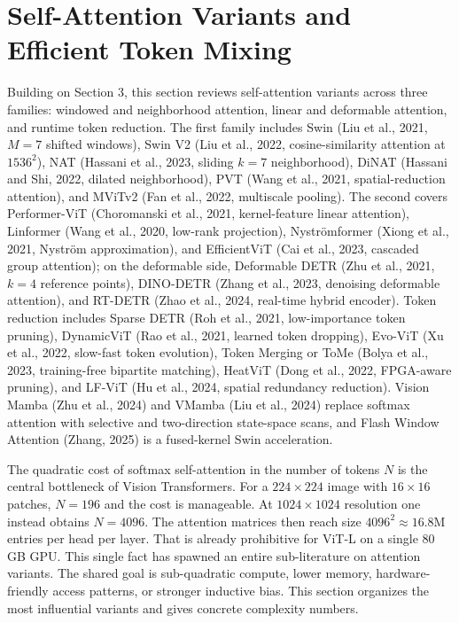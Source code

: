 \section{Self-Attention Variants and Efficient Token Mixing}\label{self-attention-variants-and-efficient-token-mixing}

Building on Section 3, this section reviews self-attention variants across three families: windowed and neighborhood attention, linear and deformable attention, and runtime token reduction. The first family includes Swin (Liu et al., 2021, \(M{=}7\) shifted windows), Swin V2 (Liu et al., 2022, cosine-similarity attention at \(1536^2\)), NAT (Hassani et al., 2023, sliding \(k{=}7\) neighborhood), DiNAT (Hassani and Shi, 2022, dilated neighborhood), PVT (Wang et al., 2021, spatial-reduction attention), and MViTv2 (Fan et al., 2022, multiscale pooling). The second covers Performer-ViT (Choromanski et al., 2021, kernel-feature linear attention), Linformer (Wang et al., 2020, low-rank projection), Nyströmformer (Xiong et al., 2021, Nyström approximation), and EfficientViT (Cai et al., 2023, cascaded group attention); on the deformable side, Deformable DETR (Zhu et al., 2021, \(k{=}4\) reference points), DINO-DETR (Zhang et al., 2023, denoising deformable attention), and RT-DETR (Zhao et al., 2024, real-time hybrid encoder). Token reduction includes Sparse DETR (Roh et al., 2021, low-importance token pruning), DynamicViT (Rao et al., 2021, learned token dropping), Evo-ViT (Xu et al., 2022, slow-fast token evolution), Token Merging or ToMe (Bolya et al., 2023, training-free bipartite matching), HeatViT (Dong et al., 2022, FPGA-aware pruning), and LF-ViT (Hu et al., 2024, spatial redundancy reduction). Vision Mamba (Zhu et al., 2024) and VMamba (Liu et al., 2024) replace softmax attention with selective and two-direction state-space scans, and Flash Window Attention (Zhang, 2025) is a fused-kernel Swin acceleration.

The quadratic cost of softmax self-attention in the number of tokens \(N\) is the central bottleneck of Vision Transformers. For a \(224 \times 224\) image with \(16 \times 16\) patches, \(N = 196\) and the cost is manageable. At \(1024 \times 1024\) resolution one instead obtains \(N = 4096\). The attention matrices then reach size \(4096^2 \approx 16.8\)M entries per head per layer. That is already prohibitive for ViT-L on a single 80 GB GPU. This single fact has spawned an entire sub-literature on attention variants. The shared goal is sub-quadratic compute, lower memory, hardware-friendly access patterns, or stronger inductive bias. This section organizes the most influential variants and gives concrete complexity numbers.

